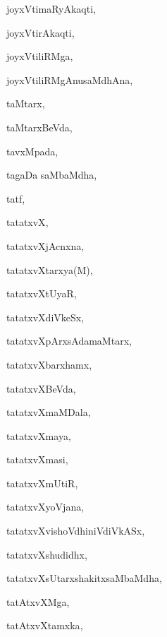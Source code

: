 \begin{multicols}{3}
{\noindent
{joyxVtimaRyAkaqti}, \pageref{joyxVtimaRyAkaqti}

\noindent
{joyxVtirAkaqti}, \pageref{joyxVtirAkaqti}

\noindent
{joyxVtiliRMga}, \pageref{joyxVtiliRMga}

\noindent
{joyxVtiliRMgAnusaMdhAna}, \pageref{joyxVtiliRMgAnusaMdhAna}

\bigskip
\noindent
{}
\smallskip

\noindent
{taMtarx}, \pageref{taMtarx}

\noindent
{taMtarxBeVda}, \pageref{taMtarxBeVda}

\noindent
{tavxMpada}, \pageref{tavxMpada}

\noindent
{tagaDa saMbaMdha}, \pageref{tagaDa saMbaMdha}

\noindent
{tatf}, \pageref{tatf}

\noindent
{tatatxvX}, \pageref{tatatxvX}

\noindent
{tatatxvXjAcnxna}, \pageref{tatatxvXjAcnxna}

\noindent
{tatatxvXtarxya(M)}, \pageref{tatatxvXtarxya(M)}

\noindent
{tatatxvXtUyaR}, \pageref{tatatxvXtUyaR}

\noindent
{tatatxvXdiVkeSx}, \pageref{tatatxvXdiVkeSx}

\noindent
{tatatxvXpArxsAdamaMtarx}, \pageref{tatatxvXpArxsAdamaMtarx}

\noindent
{tatatxvXbarxhamx}, \pageref{tatatxvXbarxhamx}

\noindent
{tatatxvXBeVda}, \pageref{tatatxvXBeVda}

\noindent
{tatatxvXmaMDala}, \pageref{tatatxvXmaMDala}

\noindent
{tatatxvXmaya}, \pageref{tatatxvXmaya}

\noindent
{tatatxvXmasi}, \pageref{tatatxvXmasi}

\noindent
{tatatxvXmUtiR}, \pageref{tatatxvXmUtiR}

\noindent
{tatatxvXyoVjana}, \pageref{tatatxvXyoVjana}

\noindent
{tatatxvXvishoVdhiniVdiVkASx}, \pageref{tatatxvXvishoVdhiniVdiVkASx}

\noindent
{tatatxvXshudidhx}, \pageref{tatatxvXshudidhx}

\noindent
{tatatxvXsUtarxshakitxsaMbaMdha}, \pageref{tatatxvXsUtarxshakitxsaMbaMdha}

\noindent
{tatAtxvXMga}, \pageref{tatAtxvXMga}

\noindent
{tatAtxvXtamxka}, \pageref{tatAtxvXtamxka}

}
\end{multicols}
